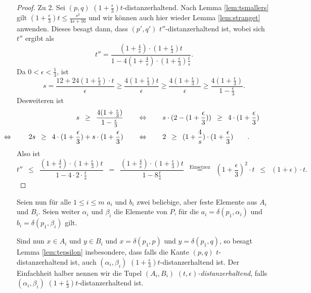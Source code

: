 \begin{proof}
    	Zu 2. 
    	Sei $(p, q)$ $(1+ \frac{\epsilon}{3})t$-distanzerhaltend. 
    	Nach Lemma \ref{lem:tsmallers} gilt $(1 + \frac{\epsilon}{3})t \leq \frac{s^2}{4s + 16}$ und wir können auch hier wieder Lemma \ref{lem:stranget} anwenden.
    	Dieses besagt dann, dass $(p', q')$ $t''$-distanzerhaltend ist, wobei sich $t''$ ergibt als 
    	\[
    	t'' = \frac{(1+\frac{4}{s})\cdot (1 + \frac{\epsilon}{3})t}{1 - 4(1 + \frac{4}{s})\cdot (1 + \frac{\epsilon}{3})\frac{t}{s}}.
    	\]
    	Da $0 < \epsilon < \frac{1}{3}$, ist
    	\[
	    	s = \frac{12 + 24(1 + \frac{\epsilon}{3})\cdot t}{\epsilon} \geq \frac{4 (1 + \frac{\epsilon}{3})t}{\epsilon}
    		\geq\frac{4 (1 + \frac{\epsilon}{3})}{\epsilon}
    		\geq\frac{4 (1 + \frac{\epsilon}{3})}{1 - \frac{\epsilon}{3}}.
    		\]
    	Desweiteren ist 
    	\begin{align*}    	
	    	s\enspace\geq\enspace\frac{4 (1 + \frac{\epsilon}{3})}{1 - \frac{\epsilon}{3}}\qquad
	    	&\Leftrightarrow \qquad s \cdot (2 - (1 + \frac{\epsilon}{3}))\enspace\geq\enspace 4 \cdot(1 + \frac{\epsilon}{3})
	    	\\2s \enspace\geq\enspace 4 \cdot(1 + \frac{\epsilon}{3}) + s \cdot (1 + \frac{\epsilon}{3}) \qquad
	    	&\Leftrightarrow \qquad 2 \enspace\geq\enspace (1 + \frac{4}{s})\cdot(1 + \frac{\epsilon}{3})
	    	\tag*{\llap{\makebox[\linewidth][l]{$\Leftrightarrow$}}}.
    	\end{align*}
    	Also ist 
    	\[
	    	t'' \enspace\leq\enspace 
	    	\frac{(1 + \frac{4}{s})\cdot (1 + \frac{\epsilon}{3})t}{1 - 4 \cdot 2 \cdot \frac{t}{s}}
	    	\enspace=\enspace \frac{(1 + \frac{4}{s})\cdot (1 + \frac{\epsilon}{3})t}{1 - 8 \frac{t}{s}}
	    	\enspace\stackrel{\text{Einsetzen}}{=}\enspace (1 + \frac{\epsilon}{3})^2\cdot t \enspace\leq\enspace (1 + \epsilon)\cdot t.
    	\]
    \end{proof}
    
    Seien nun für alle $1 \leq i \leq m$ $a_i$ und $b_i$ zwei beliebige, aber feste Elemente aus $A_i$ und $B_i$. 
    Seien weiter $\alpha_i$ und $\beta_i$ die Elemente von $P$, für die $a_i = \delta(p_1, \alpha_i)$ und $b_i = \delta(p_1, \beta_i)$ gilt.
    
    Sind nun $x \in A_i$ und $y \in B_i$ und $x = \delta(p_1, p)$ und $y = \delta(p_1, q)$, so besagt Lemma \ref{lem:tepsilon} insbesondere, dass falls die Kante $(p, q)$ $t$-distanzerhaltend ist, auch $(\alpha_i, \beta_i)$ $(1 + \frac{\epsilon}{3})t$-distanzerhaltend ist.
    Der Einfachheit halber nennen wir die Tupel $(A_i, B_i)$ \emph{$(t, \epsilon)$-distanzerhaltend}, falls $(\alpha_i, \beta_i)$ $(1 + \frac{\epsilon}{3})t$-distanzerhaltend ist.
    
